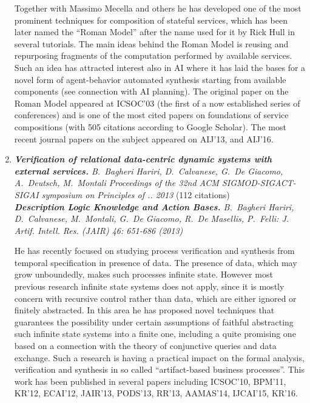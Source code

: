 \begin{enumerate}

Together with Massimo Mecella and others he has developed one of the most prominent techniques for composition of stateful services, which has been later named the “Roman Model” after the name used for it by Rick Hull in several tutorials. The main ideas behind the Roman Model is reusing and repurposing fragments of the computation performed by available services. Such an idea has attracted interest also in AI where it has laid the bases for a novel form of agent-behavior automated synthesis starting from available components (see connection with AI planning). The original paper on the Roman Model appeared at ICSOC’03 (the first of a now established series of conferences) and is one of the most cited papers on foundations of service compositions (with 505 citations according to Google Scholar). The most recent journal papers on the subject appeared on AIJ’13, and AIJ’16. 

\item \textit{\textbf{Verification of relational data-centric dynamic systems with external services.}
B.\ Bagheri Hariri, D.\ Calvanese, G.\ De Giacomo, A.\ Deutsch, M.\ Montali
Proceedings of the 32nd ACM SIGMOD-SIGACT-SIGAI symposium on Principles of .. 2013} (112 citations)\\[1ex]
%
\textit{\textbf{Description Logic Knowledge and Action Bases.}
B.\ Bagheri Hariri, D.\ Calvanese, M.\ Montali, G.\ De Giacomo, R.\ De Masellis, P.\ Felli: J. Artif. Intell. Res. (JAIR) 46: 651-686 (2013)}



He has recently focused on studying process verification and synthesis from temporal specification in presence of data. The presence of data, which may grow unboundedly, makes such processes infinite state. However most previous research infinite state systems does not apply, since it is mostly concern with recursive control rather than data, which are either ignored or finitely abstracted. In this area he has proposed novel techniques that guarantees the possibility under certain assumptions of faithful abstracting such infinite state systems into a finite one, including a quite promising one based on a connection with the theory of conjunctive queries and data exchange. Such a research is having a practical impact on the formal analysis, verification and synthesis in so called “artifact-based business processes”. This work has been published in several papers including ICSOC’10, BPM’11, KR’12, ECAI’12, JAIR’13, PODS’13, RR’13, AAMAS’14, IJCAI’15, KR’16.
\end{enumerate}

